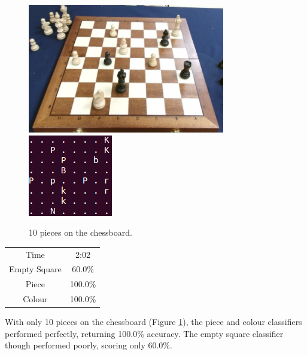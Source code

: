 \documentclass{l4proj}
\begin{document}
\vspace{10mm}
\begin{figure}[h!]
\includegraphics[scale=0.8]{ts/ts13.png} \includegraphics[scale=0.75]{ts/tsd13.png}
\caption{10 pieces on the chessboard.}
\label{ts13}
\end{figure}

\begin{table}[h!]
\centering
\begin{tabular}{|c|c|}
	\hline
	Time & 2:02 \\
	\rowcolor{brown!45}Empty Square & 60.0\%  \\
	Piece & 100.0\% \\
	\rowcolor{brown!45} Colour & 100.0\% \\
	\hline
\end{tabular}
\end{table}

With only 10 pieces on the chessboard (Figure \ref{ts13}), the piece and colour classifiers performed perfectly, returning 100.0\% accuracy. The empty square classifier though performed poorly, scoring only 60.0\%.
\end{document}
